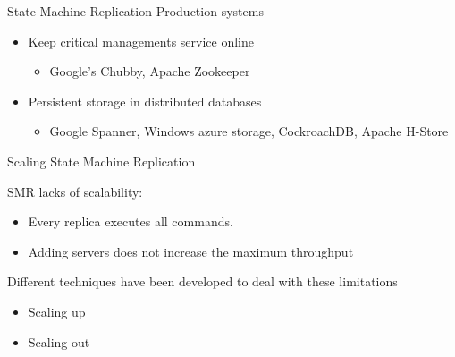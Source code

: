 \documentclass[10pt]{beamer}
\begin{document}
\begin{frame}[fragile]{State Machine Replication}
  Production systems
  \begin{itemize}
    \item Keep critical managements service online
    \begin{itemize}
      \item Google's Chubby, Apache Zookeeper
    \end{itemize}
    \item Persistent storage in distributed databases
    \begin{itemize}
      \item Google Spanner, Windows azure storage, CockroachDB, Apache H-Store
    \end{itemize}
  \end{itemize}
\end{frame}


\begin{frame}[fragile]{Scaling State Machine Replication}

  SMR lacks of scalability:
  \begin{itemize}
    \item Every replica executes all commands.
    \item Adding servers does not increase the maximum throughput
  \end{itemize}
  
  Different techniques have been developed to deal with these limitations
  \begin{itemize}
    \item Scaling up
    \item Scaling out
  \end{itemize}

\end{frame}
\end{document}
